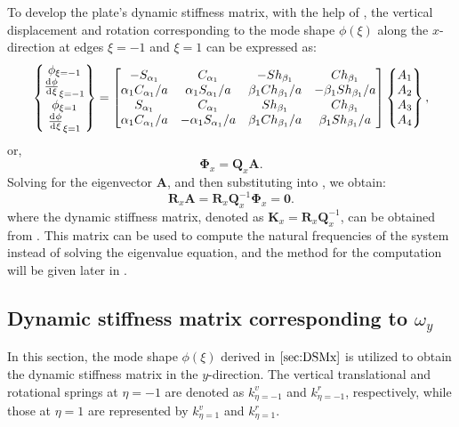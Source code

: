 \documentclass[preprint,12pt,number]{elsarticle}
\newcommand{\id}{\mathrm{d}\mkern1mu}
\begin{document}
To develop the plate's dynamic stiffness matrix, with the help of , the vertical displacement and rotation corresponding to the mode shape $\phi(\xi)$ along the $x$-direction at edges $\xi = -1$ and $\xi = 1$ can be expressed as:
%
\begin{equation}\label{eq:UBx}
\begin{split}
	\begin{Bmatrix}
		\phi_{\xi=-1}\\\frac{\id \phi}{\id \xi}_{\xi=-1}\\\phi_{\xi=1}\\\frac{\id \phi}{\id \xi}_{\xi=1}
	\end{Bmatrix}
	= \begin{bmatrix}
		-S_{\alpha_1}&C_{\alpha_1}&-Sh_{\beta_1}&Ch_{\beta_1}\\
		\alpha_1 C_{\alpha_1}/a&\alpha_1S_{\alpha_1}/a&\beta_1Ch_{\beta_1}/a&-\beta_1Sh_{\beta_1}/a\\
		S_{\alpha_1}&C_{\alpha_1}&Sh_{\beta_1}&Ch_{\beta_1}\\
		\alpha_1 C_{\alpha_1}/a&-\alpha_1S_{\alpha_1}/a&\beta_1Ch_{\beta_1}/a&\beta_1Sh_{\beta_1}/a
	\end{bmatrix}
	\begin{Bmatrix}
		A_1\\A_2\\A_3\\A_4
	\end{Bmatrix} ,
\end{split}
\end{equation}
%
or,
%
\begin{equation}\label{eq:UBx1}
\mathbf{\Phi}_x= \mathbf{Q}_x\mathbf{A}.
\end{equation}
%
Solving for the eigenvector $\mathbf{A}$, and then substituting into , we obtain:
%
\begin{equation}\label{eq:DSM_eqx}
\mathbf{R}_x \mathbf{A}=\mathbf{R}_x\mathbf{Q}_x^{-1}\mathbf{\Phi}_x = \mathbf{0}.
\end{equation}
%
where the dynamic stiffness matrix, denoted as $\mathbf{K}_x = \mathbf{R}_x\mathbf{Q}_x^{-1}$, can be obtained from . 
This matrix can be used to compute the natural frequencies of the system instead of solving the eigenvalue equation, 
and the method for the computation will be given later in .

\subsection{Dynamic stiffness matrix corresponding to $\omega_y$}\label{sec:DSMy}
In this section, the mode shape $\phi(\xi)$ derived in $\Cref{sec:DSMx}$ is utilized to obtain the dynamic stiffness matrix in the $y$-direction.  
The vertical translational and rotational springs at $\eta = -1$ are denoted as $k^v_{\eta = -1}$ and $k^r_{\eta = -1}$, respectively, while those at $\eta = 1$ are represented by $k^v_{\eta = 1}$ and $k^r_{\eta = 1}$.
\end{document}

